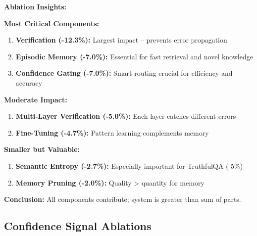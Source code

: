 \documentclass[12pt,a4paper]{article}
\theoremstyle{definition}
\begin{document}
\begin{keyinsightbox}
\textbf{Ablation Insights:}

\textbf{Most Critical Components:}
\begin{enumerate}
    \item \textbf{Verification (-12.3\%):} Largest impact -- prevents error propagation
    \item \textbf{Episodic Memory (-7.0\%):} Essential for fast retrieval and novel knowledge
    \item \textbf{Confidence Gating (-7.0\%):} Smart routing crucial for efficiency and accuracy
\end{enumerate}

\textbf{Moderate Impact:}
\begin{enumerate}
    \item \textbf{Multi-Layer Verification (-5.0\%):} Each layer catches different errors
    \item \textbf{Fine-Tuning (-4.7\%):} Pattern learning complements memory
\end{enumerate}

\textbf{Smaller but Valuable:}
\begin{enumerate}
    \item \textbf{Semantic Entropy (-2.7\%):} Especially important for TruthfulQA (-5\%)
    \item \textbf{Memory Pruning (-2.0\%):} Quality > quantity for memory
\end{enumerate}

\textbf{Conclusion:} All components contribute; system is greater than sum of parts.
\end{keyinsightbox}

\subsection{Confidence Signal Ablations}
\end{document}
